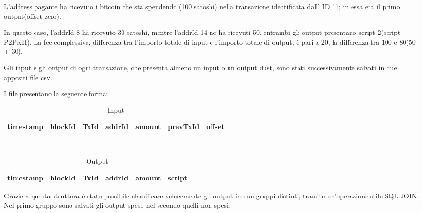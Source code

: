 L’address pagante
ha ricevuto i bitcoin che sta spendendo (100 satoshi) nella transazione identificata dall' ID 11; in essa era il primo output(offset zero). 

In questo caso, l’addrId 8 ha ricevuto 30 satoshi, mentre l’addrId 14 ne ha ricevuti 50, entrambi gli output presentano script 2(script P2PKH). La fee complessiva, differenza tra l'importo totale di input e l'importo totale di output, è pari a 20, la differenza tra 100 e 80(50 + 30).

Gli input e gli output di ogni transazione, che presenta almeno un input o un output dust, sono stati successivamente salvati in due appositi file csv.

I file presentano la seguente forma:

\begin{table}[h!]
\centering
\begin{tabular}{|r|r|r|r|r|r|r|}
\toprule
 timestamp &  blockId &   TxId &  addrId &     amount &  prevTxId &  offset \\
\bottomrule
\end{tabular}
\caption{Input}
\label{table: input}
\end{table}\\

\begin{table}[h!]
\centering
\begin{tabular}{|r|r|r|r|r|r|}
\toprule
 timestamp &  blockId &   TxId &  addrId &     amount &  script \\
\bottomrule
\end{tabular}
\caption{Output}
\label{table: output}
\end{table}
Grazie a questa struttura è stato possibile classificare velocemente gli output in due gruppi distinti, tramite un'operazione stile SQL JOIN. Nel primo gruppo sono salvati gli output spesi, nel secondo quelli non spesi. 

